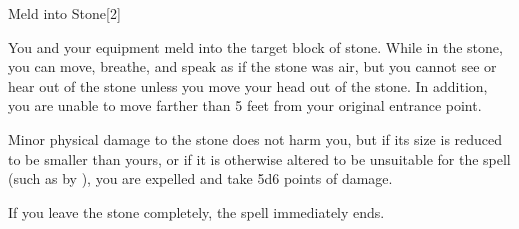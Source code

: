 \begin{spellsection}{Meld into Stone}[2]
    \begin{spellheader}
    \end{spellheader}
    \begin{spellcontent}
        \begin{spelltargetinginfo}
        \end{spelltargetinginfo}
        \begin{spelleffects}
            \spelleffect You and your equipment meld into the target block of stone. While in the stone, you can move, breathe, and speak as if the stone was air, but you cannot see or hear out of the stone unless you move your head out of the stone. In addition, you are unable to move farther than 5 feet from your original entrance point.

            Minor physical damage to the stone does not harm you, but if its size is reduced to be smaller than yours, or if it is otherwise altered to be unsuitable for the spell (such as by ), you are expelled and take 5d6 points of damage.

            If you leave the stone completely, the spell immediately ends.

            \spelldur \durlong
        \end{spelleffects}
    \end{spellcontent}
    \begin{spellfooter}
        \miscastexplode
    \end{spellfooter}
    \begin{spellaugments}
    \end{spellaugments}
\end{spellsection}

